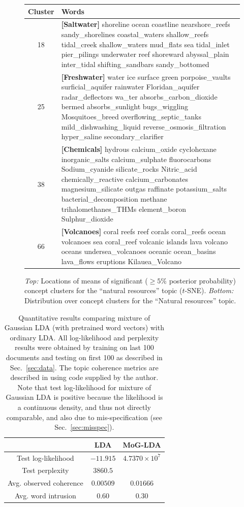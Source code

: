 \documentclass[11pt]{article}
\begin{document}
\begin{figure}
\begin{tabularx}{\columnwidth}{|c|X|}
\hline 
{\tiny{}Cluster} & {\tiny{}Words}\tabularnewline
\hline 
{\tiny{}18} & {\tiny{}\textbf{[Saltwater]} shoreline ocean coastline nearshore\_reefs sandy\_shorelines
coastal\_waters shallow\_reefs tidal\_creek shallow\_waters mud\_flats
sea tidal\_inlet pier\_pilings underwater reef shoreward abyssal\_plain
inter\_tidal shifting\_sandbars sandy\_bottomed }\tabularnewline
\hline 
{\tiny{}25} & {\tiny{}\textbf{[Freshwater]} water ice surface green porpoise\_vaults surficial\_aquifer
rainwater Floridan\_aquifer radar\_deflectors wa\_ter absorbs\_carbon\_dioxide
bermed absorbs\_sunlight bugs\_wiggling Mosquitoes\_breed overflowing\_septic\_tanks
mild\_dishwashing\_liquid reverse\_osmosis\_filtration hyper\_saline
secondary\_clarifier }\tabularnewline
\hline 
{\tiny{}38} & {\tiny{}\textbf{[Chemicals]} hydrous calcium\_oxide cyclohexane inorganic\_salts calcium\_sulphate
fluorocarbons Sodium\_cyanide silicate\_rocks Nitric\_acid chemically\_reactive
calcium\_carbonates magnesium\_silicate outgas raffinate potassium\_salts
bacterial\_decomposition methane trihalomethanes\_THMs element\_boron
Sulphur\_dioxide }\tabularnewline
\hline 
{\tiny{}66} & {\tiny{}\textbf{[Volcanoes]} coral reefs reef corals coral\_reefs ocean volcanoes sea coral\_reef
volcanic islands lava volcano oceans undersea\_volcanoes oceanic ocean\_basins
lava\_flows eruptions Kilauea\_Volcano}\tabularnewline
\hline 
\end{tabularx}

\caption{\label{fig:gtm-nat-res} \emph{Top:} Locations of means of significant ($\geq 5\%$ posterior probability) concept clusters for the ``natural resources'' topic ($t$-SNE). \emph{Bottom:} Distribution over concept clusters for the ``Natural resources'' topic.}
\end{figure}

\begin{table}
\centering
\begin{tabular}{|c|c|c|}
\cline{2-3} 
\multicolumn{1}{c|}{} & LDA & MoG-LDA\tabularnewline
\hline 
Test log-likelihood & $-11.915$ & $4.7370 \times 10^7$ \tabularnewline
\hline 
Test perplexity & $3860.5$ & \tabularnewline
\hline 
Avg. observed coherence & $0.00509$ & $0.01666$ \tabularnewline
\hline 
Avg. word intrusion & $0.60$ & $0.30$ \tabularnewline
\hline 
\end{tabular}
\caption{\label{fig:quant} Quantitative results comparing mixture of Gaussian LDA (with pretrained word vectors) with ordinary LDA. All log-likelihood and perplexity results were obtained by training on last 100 documents and testing on first 100 as described in Sec.~\ref{sec:data}. The topic coherence metrics are described in \cite{Lau14} using code supplied by the author. Note that test log-likelihood for mixture of Gaussian LDA is positive because the likelihood is a continuous density, and thus not directly comparable, and also due to mis-specification (see Sec.~\ref{sec:misspec}).}
\end{table}
\end{document}
